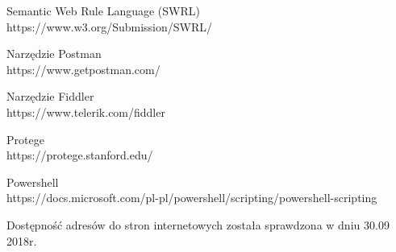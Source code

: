 \begin{thebibliography}{1}
Semantic Web Rule Language (SWRL)
\\
https://www.w3.org/Submission/SWRL/

Narzędzie Postman
\\
https://www.getpostman.com/


Narzędzie Fiddler
\\
https://www.telerik.com/fiddler

 Protege
\\
https://protege.stanford.edu/

 Powershell
\\
https://docs.microsoft.com/pl-pl/powershell/scripting/powershell-scripting

\end{thebibliography}

Dostępność adresów do stron internetowych została sprawdzona w dniu 30.09 2018r.
